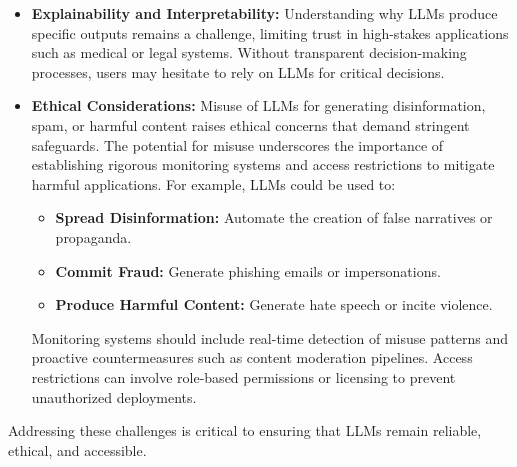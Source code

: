 \begin{itemize}
        \item \textbf{Explainability and Interpretability:} Understanding why LLMs produce specific outputs remains a challenge, limiting trust in high-stakes applications such as medical or legal systems. Without transparent decision-making processes, users may hesitate to rely on LLMs for critical decisions.

        \item \textbf{Ethical Considerations:} Misuse of LLMs for generating disinformation, spam, or harmful content raises ethical concerns that demand stringent safeguards. The potential for misuse underscores the importance of establishing rigorous monitoring systems and access restrictions to mitigate harmful applications. For example, LLMs could be used to:
        \begin{itemize}
            \item \textbf{Spread Disinformation:} Automate the creation of false narratives or propaganda.
            \item \textbf{Commit Fraud:} Generate phishing emails or impersonations.
            \item \textbf{Produce Harmful Content:} Generate hate speech or incite violence.
        \end{itemize}
        Monitoring systems should include real-time detection of misuse patterns and proactive countermeasures such as content moderation pipelines. Access restrictions can involve role-based permissions or licensing to prevent unauthorized deployments.
    \end{itemize}

    Addressing these challenges is critical to ensuring that LLMs remain reliable, ethical, and accessible. 

